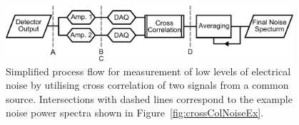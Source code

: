 \begin{figure}[tb]
\begin{center}
\includegraphics[width = 0.95\textwidth]{figures/crossCol_flow}
\caption[Cross-correlated noise measurement process flow]{Simplified process flow for measurement of low levels of electrical noise by utilising cross correlation of two signals from a common source. Intersections with dashed lines correspond to the example noise power spectra shown in Figure~\ref{fig:crossColNoiseEx}.}
\label{fig:crossCol_flow}
\end{center}
\end{figure}
\par
